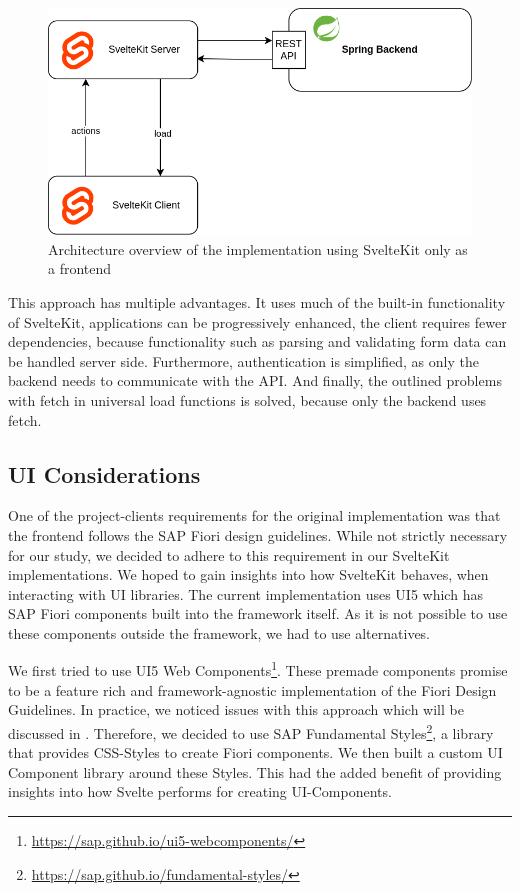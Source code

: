 \begin{figure}[ht]
    \centering
    \includegraphics[width=.6\linewidth]{assets/fe-only-all-server}
    \caption{Architecture overview of the implementation using SvelteKit only as a frontend}
    \label{fig:dswfd-architecture-fe-through-server}
\end{figure}

This approach has multiple advantages. It uses much of the built-in functionality of SvelteKit, applications can be progressively enhanced, the client requires fewer dependencies, because functionality such as parsing and validating form data can be handled server side. Furthermore, authentication is simplified, as only the backend needs to communicate with the API. And finally, the outlined problems with fetch in universal load functions is solved, because only the backend uses fetch.


\subsection{UI Considerations}
\label{sec:implementation-ui}
One of the project-clients requirements for the original implementation was that the frontend follows the SAP Fiori design guidelines. While not strictly necessary for our study, we decided to adhere to this requirement in our SvelteKit implementations. We hoped to gain insights into how SvelteKit behaves, when interacting with UI libraries. The current implementation uses UI5 which has SAP Fiori components built into the framework itself. As it is not possible to use these components outside the framework, we had to use alternatives.   

We first tried to use UI5 Web Components\footnote{\url{https://sap.github.io/ui5-webcomponents/}}. These premade components promise to be a feature rich and framework-agnostic implementation of the Fiori Design Guidelines. In practice, we noticed issues with this approach which will be discussed in . Therefore, we decided to use SAP Fundamental Styles\footnote{\url{https://sap.github.io/fundamental-styles/}}, a library that provides CSS-Styles to create Fiori components. We then built a custom UI Component library around these Styles. This had the added benefit of providing insights into how Svelte performs for creating UI-Components.


